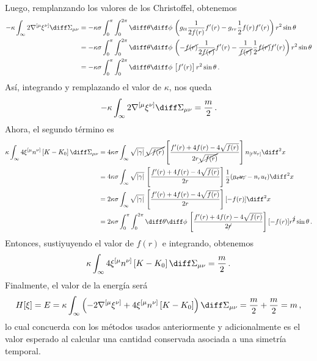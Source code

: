 \documentclass[../Main.tex]{subfiles}
\begin{document}
Luego, remplanzando los valores de los Christoffel, obtenemos
\begin{align}\notag
-\kappa\int_{\infty}2\nabla^{[\mu}\xi^{\nu]}\diff\Sigma_{\mu\nu}&=-\kappa\sigma\int_{0}^{\pi}\int_{0}^{2\pi}\diff\theta \diff\phi\,\left(g_{tt}\frac{1}{2f(r)}f'(r)-g_{rr}\frac{1}{2}f(r)f'(r)\right)r^{2}\sin{\theta}\\ \notag
&=-\kappa\sigma\int_{0}^{\pi}\int_{0}^{2\pi}\diff\theta \diff\phi\,\left(-\cancel{f(r)}\frac{1}{2\cancel{f(r)}}f'(r)-\frac{1}{\cancel{f(r)}}\frac{1}{2}\cancel{f(r)}f'(r)\right)r^{2}\sin{\theta} \\ \notag
&=-\kappa\sigma\int_{0}^{\pi}\int_{0}^{2\pi}\diff\theta \diff\phi\,\left[f'(r)\right]r^{2}\sin{\theta} \notag \, .
\end{align}
Así, integrando y remplazando el valor de $\kappa$, nos queda
\begin{align}
-\kappa\int_{\infty}2\nabla^{[\mu}\xi^{\nu]}\diff\Sigma_{\mu\nu}=\frac{m}{2}\, .
\end{align}
Ahora, el segundo término es
\begin{align}\notag
\kappa\int_{\infty}4  \xi^{[\mu} n^{\nu]} \left[K-K_0\right]\diff\Sigma_{\mu\nu}&=4\kappa\sigma\int_{\infty}\sqrt{|\gamma|}\,\cancel{\sqrt{f(r)}}\left[\frac{f'(r)+4f(r)-4\sqrt{f(r)}}{2r\cancel{\sqrt{f(r)}}}\right]n_{[t}u_{r]}\diff^{2}x\\ \notag
&=4\kappa\sigma\int_{\infty}\sqrt{|\gamma|}\,\left[\frac{f'(r)+4f(r)-4\sqrt{f(r)}}{2r}\right]\frac{1}{2}(\cancel{n_{t}u_{r}}-n_{r}u_{t})\diff^{2}x\\ \notag
&=2\kappa\sigma\int_{\infty}\sqrt{|\gamma|}\,\left[\frac{f'(r)+4f(r)-4\sqrt{f(r)}}{2r}\right][-f(r)]\diff^{2}x\\ \notag
&=2\kappa\sigma\int_{0}^{\pi}\int_{0}^{2\pi}\diff\theta \diff\phi\,\left[\frac{f'(r)+4f(r)-4\sqrt{f(r)}}{2\cancel{r}}\right][-f(r)]r^{\cancel{2}}\sin{\theta}\, .
\end{align}
Entonces, sustiyuyendo el valor de $f(r)$ e integrando, obtenemos 
\begin{align}
    \kappa\int_{\infty}4  \xi^{[\mu} n^{\nu]} \left[K-K_0\right]\diff\Sigma_{\mu\nu}=\frac{m}{2}\, .
\end{align}
Finalmente, el valor de la energía será 
\begin{align}
H[\xi]=E=\kappa\int_{\infty}\left(-2\nabla^{[\mu}\xi^{\nu]}+4  \xi^{[\mu} n^{\nu]} \left[K-K_0\right]\right) \diff\Sigma_{\mu\nu}=\frac{m}{2}+\frac{m}{2}=m\, ,
\end{align}
lo cual concuerda con los métodos usados anteriormente y adicionalmente es el valor esperado al calcular una cantidad conservada asociada a una simetría temporal.
\end{document}
